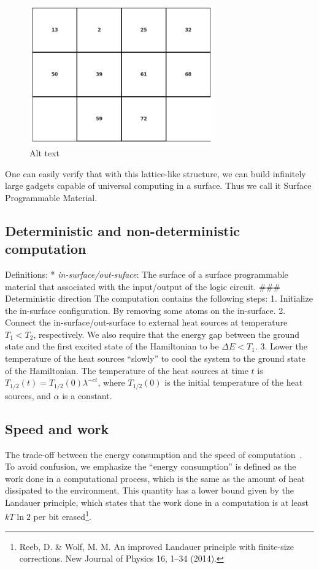 \documentclass[twocolumn,superscriptaddress,english,showpacs,longbibliography]{revtex4-2}
\begin{document}
\begin{figure}
\centering
\includegraphics[width=3.125in,height=\textheight,keepaspectratio]{../notes/images/rule110_2-2_automaton.png}
\caption{Alt text}
\end{figure}

One can easily verify that with this lattice-like structure, we can
build infinitely large gadgets capable of universal computing in a
surface. Thus we call it Surface Programmable Material.

\subsection{Deterministic and non-deterministic
computation}\label{deterministic-and-non-deterministic-computation}

Definitions: * \emph{in-surface/out-suface}: The surface of a surface
programmable material that associated with the input/output of the logic
circuit. \#\#\# Deterministic direction The computation contains the
following steps: 1. Initialize the in-surface configuration. By removing
some atoms on the in-surface. 2. Connect the in-surface/out-surface to
external heat sources at temperature $T_1 < T_2$, respectively. We
also require that the energy gap between the ground state and the first
excited state of the Hamiltonian to be $\Delta E< T_1$. 3. Lower the
temperature of the heat sources ``slowly'' to cool the system to the
ground state of the Hamiltonian. The temperature of the heat sources at
time $t$ is $T_{1/2}(t) = T_{1/2}(0)\lambda^{-c t}$, where
$T_{1/2}(0)$ is the initial temperature of the heat sources, and
$\alpha$ is a constant.

\subsection{Speed and work}\label{speed-and-work}

The trade-off between the energy consumption and the speed of
computation~\cite{Feynman2018}. To avoid confusion, we emphasize the
``energy consumption'' is defined as the work done in a computational
process, which is the same as the amount of heat dissipated to the
environment. This quantity has a lower bound given by the Landauer
principle, which states that the work done in a computation is at least
$kT\ln 2$ per bit erased\footnote{Reeb, D. \& Wolf, M. M. An improved
  Landauer principle with finite-size corrections. New Journal of
  Physics 16, 1--34 (2014).}.
\end{document}

